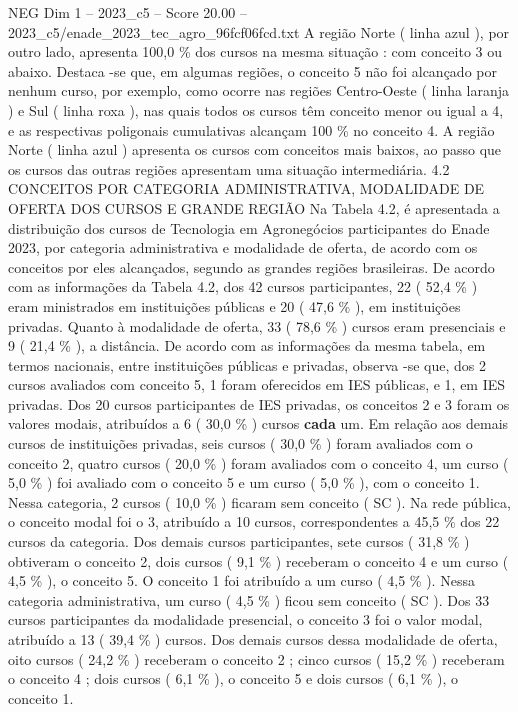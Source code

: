 \begin{textsample}{NEG Dim 1 – 2023\_c5 – Score 20.00 – 2023\_c5/enade\_2023\_tec\_agro\_96fcf06fcd.txt}
A região Norte ( linha azul ), por outro lado, apresenta 100,0 \% dos cursos na mesma situação : com conceito 3 ou abaixo.
Destaca -se que, em algumas regiões, o conceito 5 não foi alcançado por nenhum curso, por exemplo, como ocorre nas regiões Centro-Oeste ( linha laranja ) e Sul ( linha roxa ), nas quais todos os cursos têm conceito menor ou igual a 4, e as respectivas poligonais cumulativas alcançam 100 \% no conceito 4.
A região Norte ( linha azul ) apresenta os cursos com conceitos mais baixos, ao passo que os cursos das outras regiões apresentam uma situação intermediária. 4.2 CONCEITOS POR CATEGORIA ADMINISTRATIVA, MODALIDADE DE OFERTA DOS CURSOS E GRANDE REGIÃO Na Tabela 4.2, é apresentada a distribuição dos cursos de Tecnologia em Agronegócios participantes do Enade 2023, por categoria administrativa e modalidade de oferta, de acordo com os conceitos por eles alcançados, segundo as grandes regiões brasileiras.
De acordo com as informações da Tabela 4.2, dos 42 cursos participantes, 22 ( 52,4 \% ) eram ministrados em instituições públicas e 20 ( 47,6 \% ), em instituições privadas.
Quanto à modalidade de oferta, 33 ( 78,6 \% ) cursos eram presenciais e 9 ( 21,4 \% ), a distância.
De acordo com as informações da mesma tabela, em termos nacionais, entre instituições públicas e privadas, observa -se que, dos 2 cursos avaliados com conceito 5, 1 foram oferecidos em IES públicas, e 1, em IES privadas.
Dos 20 cursos participantes de IES privadas, os conceitos 2 e 3 foram os valores modais, atribuídos a 6 ( 30,0 \% ) cursos \textbf{cada} um.
Em relação aos demais cursos de instituições privadas, seis cursos ( 30,0 \% ) foram avaliados com o conceito 2, quatro cursos ( 20,0 \% ) foram avaliados com o conceito 4, um curso ( 5,0 \% ) foi avaliado com o conceito 5 e um curso ( 5,0 \% ), com o conceito 1.
Nessa categoria, 2 cursos ( 10,0 \% ) ficaram sem conceito ( SC ).
Na rede pública, o conceito modal foi o 3, atribuído a 10 cursos, correspondentes a 45,5 \% dos 22 cursos da categoria.
Dos demais cursos participantes, sete cursos ( 31,8 \% ) obtiveram o conceito 2, dois cursos ( 9,1 \% ) receberam o conceito 4 e um curso ( 4,5 \% ), o conceito 5.
O conceito 1 foi atribuído a um curso ( 4,5 \% ).
Nessa categoria administrativa, um curso ( 4,5 \% ) ficou sem conceito ( SC ).
Dos 33 cursos participantes da modalidade presencial, o conceito 3 foi o valor modal, atribuído a 13 ( 39,4 \% ) cursos.
Dos demais cursos dessa modalidade de oferta, oito cursos ( 24,2 \% ) receberam o conceito 2 ; cinco cursos ( 15,2 \% ) receberam o conceito 4 ; dois cursos ( 6,1 \% ), o conceito 5 e dois cursos ( 6,1 \% ), o conceito 1.

\end{textsample}

